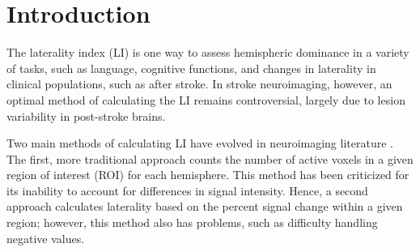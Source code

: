 \documentclass[twocolumn]{bmcart}%
\begin{document}
\begin{frontmatter}
\begin{fmbox}

	








%
\end{fmbox}%

\end{frontmatter}


\section{Introduction}\label{introduction}

The laterality index (LI) is one way to assess hemispheric dominance in
a variety of tasks, such as language, cognitive functions, and changes
in laterality in clinical populations, such as after stroke. In stroke
neuroimaging, however, an optimal method of calculating the LI remains
controversial, largely due to lesion variability in post-stroke brains.

Two main methods of calculating LI have evolved in neuroimaging
literature \cite{Jansen2006}. The first, more traditional approach
counts the number of active voxels in a given region of interest (ROI)
for each hemisphere. This method has been criticized for its inability
to account for differences in signal intensity. Hence, a second approach
calculates laterality based on the percent signal change within a given
region; however, this method also has problems, such as difficulty
handling negative values.
\end{document}
